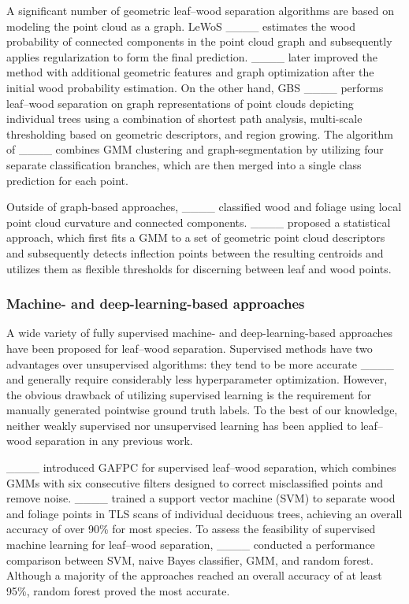 A significant number of geometric leaf--wood separation algorithms are based on modeling the point cloud as a graph. LeWoS ____ estimates the wood probability of connected components in the point cloud graph and subsequently applies regularization to form the final prediction. ____ later improved the method with additional geometric features and graph optimization after the initial wood probability estimation. On the other hand, GBS ____ performs leaf--wood separation on graph representations of point clouds depicting individual trees using a combination of shortest path analysis, multi-scale thresholding based on geometric descriptors, and region growing. The algorithm of ____ combines GMM clustering and graph-segmentation by utilizing four separate classification branches, which are then merged into a single class prediction for each point.

Outside of graph-based approaches, ____ classified wood and foliage using local point cloud curvature and connected components. ____ proposed a statistical approach, which first fits a GMM to a set of geometric point cloud descriptors and subsequently detects inflection points between the resulting centroids and utilizes them as flexible thresholds for discerning between leaf and wood points.

\subsubsection{Machine- and deep-learning-based approaches}

A wide variety of fully supervised machine- and deep-learning-based approaches have been proposed for leaf--wood separation. Supervised methods have two advantages over unsupervised algorithms: they tend to be more accurate ____ and generally require considerably less hyperparameter optimization. However, the obvious drawback of utilizing supervised learning is the requirement for manually generated pointwise ground truth labels. To the best of our knowledge, neither weakly supervised nor unsupervised learning has been applied to leaf--wood separation in any previous work.

____ introduced GAFPC for supervised leaf--wood separation, which combines GMMs with six consecutive filters designed to correct misclassified points and remove noise. ____ trained a support vector machine (SVM) to separate wood and foliage points in TLS scans of individual deciduous trees, achieving an overall accuracy of over 90\% for most species. To assess the feasibility of supervised machine learning for leaf--wood separation, ____ conducted a performance comparison between SVM, naive Bayes classifier, GMM, and random forest. Although a majority of the approaches reached an overall accuracy of at least 95\%, random forest proved the most accurate.

